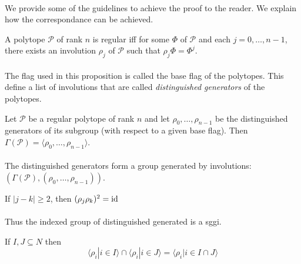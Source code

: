 \paragraph{}
We provide some of the guidelines to achieve the proof to the reader. We explain how the correspondance can be achieved.

\begin{proposition}
  A polytope $\mathcal P$ of rank $n$ is regular iff for some $\Phi$ of $\mathcal P$ and each $j = 0, \dots, n-1$, there exists an involution $\rho_j$ of $\mathcal P$ such that $\rho_j \Phi = \Phi^j$.
\end{proposition}

\paragraph{}
The flag used in this proposition is called the base flag of the polytopes. This define a list of involutions that are called \textit{distinguished generators} of the polytopes.

\begin{proposition}
  Let $\mathcal P$ be a regular polytope of rank $n$ and let $\rho_0, \dots, \rho_{n-1}$ be the distinguished generators of its subgroup (with respect to a given base flag). Then $\Gamma(\mathcal P) = \langle \rho_0, \dots, \rho_{n-1} \rangle$.
\end{proposition}

\paragraph{}
The distinguished generators form a group generated by involutions: $(\Gamma(\mathcal P), (\rho_0, \dots, \rho_{n-1}))$.

\begin{property}
  If $|j - k| \ge 2$, then $(\rho_j \rho_k)^2 = \operatorname{id}$
\end{property}

\paragraph{}
Thus the indexed group of distinguished generated is a sggi.

\begin{property}
  If $I, J \subseteq N$ then
  \[
    \langle \rho_i | i \in I \rangle \cap \langle \rho_i | i \in J \rangle = \langle \rho_i | i \in I \cap J \rangle
  \]
\end{property}

